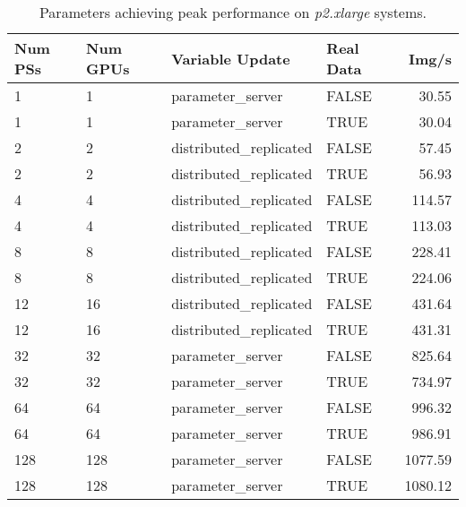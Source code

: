 \begin{table}[H]
 \centering
 \begin{tabular}{||l | l | l | l | r||} 
 \hline
\textbf{Num PSs} & \textbf{Num GPUs} & \textbf{Variable Update} & \textbf{Real Data} & \textbf{Img/s}\\ [0.5ex] 
\hline\hline
 1 & 1 & parameter\_server & FALSE & 30.55\\\hline
 1 & 1 & parameter\_server & TRUE & 30.04\\\hline
 2 & 2 & distributed\_replicated & FALSE & 57.45\\\hline
 2 & 2 & distributed\_replicated & TRUE & 56.93\\\hline
 4 & 4 & distributed\_replicated & FALSE & 114.57\\\hline
 4 & 4 & distributed\_replicated & TRUE & 113.03\\\hline
 8 & 8 & distributed\_replicated & FALSE & 228.41\\\hline
 8 & 8 & distributed\_replicated & TRUE & 224.06\\\hline
 12 & 16 & distributed\_replicated & FALSE & 431.64\\\hline
 12 & 16 & distributed\_replicated & TRUE & 431.31\\\hline
 32 & 32 & parameter\_server & FALSE & 825.64\\\hline
 32 & 32 & parameter\_server & TRUE & 734.97\\\hline
 64 & 64 & parameter\_server & FALSE & 996.32\\\hline
 64 & 64 & parameter\_server & TRUE & 986.91\\\hline
 128 & 128 & parameter\_server & FALSE & 1077.59\\\hline
 128 & 128 & parameter\_server & TRUE & 1080.12\\\hline
\end{tabular}
\caption{Parameters achieving peak performance on \textit{p2.xlarge} systems.}
\label{tab:peak-perf-p2}
\end{table}

